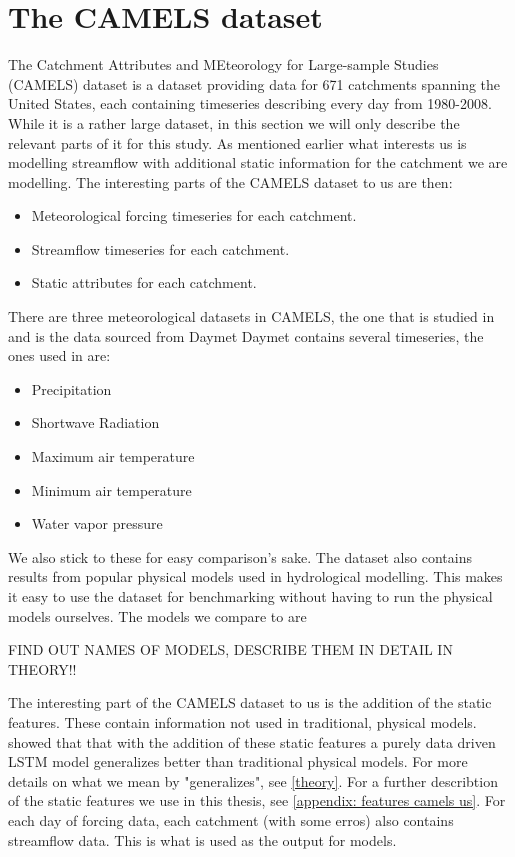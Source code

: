 \section{The CAMELS dataset}
The Catchment Attributes and MEteorology for Large-sample Studies (CAMELS) dataset \citep{CAMELS_US}
is a dataset providing data for 671 catchments spanning the United States, each
containing timeseries describing every day from 1980-2008. While 
it is a rather large dataset, 
in this section we will only describe the relevant parts of it for this study. 
As mentioned earlier what interests us is modelling streamflow with additional 
static information for the catchment we are modelling. The interesting parts of
the CAMELS dataset to us are then:
\begin{itemize}
    \item Meteorological forcing timeseries for each catchment.
    \item Streamflow timeseries for each catchment.
    \item Static attributes for each catchment.
\end{itemize}
There are three meteorological datasets in CAMELS, the one that is studied in \citet{CAMELS_US}
and \citet{lstm_second_paper} is the data sourced from Daymet \citet{thornton2012daymet}
Daymet contains several timeseries, the ones used in \citet{lstm_second_paper} are:
\begin{itemize}
    \item Precipitation
    \item Shortwave Radiation
    \item Maximum air temperature
    \item Minimum air temperature
    \item Water vapor pressure
\end{itemize}
We also stick to these for easy comparison's sake.
The dataset also contains results from popular physical models used in hydrological 
modelling. This makes it easy to use the dataset for benchmarking without having 
to run the physical models ourselves. The models we compare to are \begin{Large}
FIND OUT NAMES OF MODELS, DESCRIBE THEM IN DETAIL IN THEORY!!
\end{Large}
The interesting part of the CAMELS dataset to us is the addition of the static 
features. These contain information not used in traditional, physical models. 
\citet{lstm_second_paper,lstm_third_paper} showed that that
with the addition of these static features a purely data driven LSTM model generalizes
better than traditional physical models. For more details on what we mean by 
"generalizes", see \ref{theory}. For a further describtion of the static features
we use in this thesis, see \ref{appendix: features camels us}.
For each day of forcing data, each catchment (with some erros) also contains 
streamflow data. This is what is used as the output for models.

